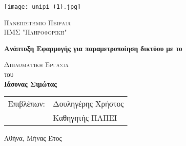 \begin{titlepage}
    \begin{center}
        \vspace*{-1cm}
        
        \texttt{[image: unipi (1).jpg]}
        
        \Large
        \textsc{Πανεπιστήμιο Πειραιά}\\
        \large
        \textsc{ΠΜΣ "Πληροφορική"}\\
        
        \vspace{2.5cm}
        
        \Huge
        \textbf{Ανάπτυξη Εφαρμογής για παραμετροποίηση δικτύου με το }
        
        \vspace{3cm}
        \Large
        \textsc{Διπλωματικη Εργασια}\\
        του\\

        \LARGE
        \textbf{Ιάσονας Σιμώτας}
        
    \end{center}
    
    \vspace{3cm}
    
   

    \begin{tabular}{ll}
		Επιβλέπων: & Δουληγέρης Χρήστος \\
		 & Καθηγητής ΠΑΠΕΙ
	\end{tabular}
	
    \vfill
    
    \begin{center}
    	 Αθήνα, Μήνας Έτος	
    \end{center}
\end{titlepage}